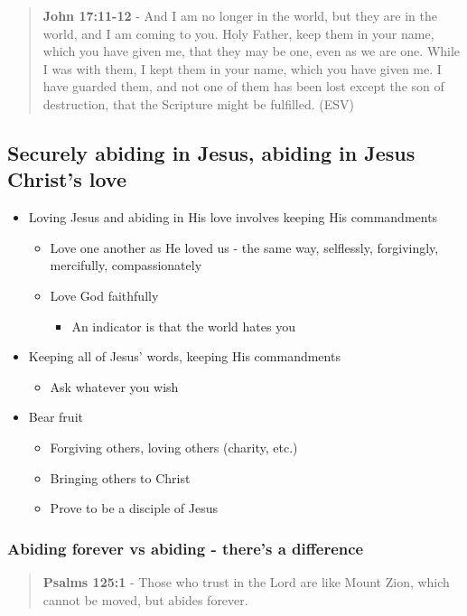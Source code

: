 \documentclass[11pt]{article}
\begin{document}
\begin{quote}
\textbf{John 17:11-12} -  And I am no longer in the world, but they are in the world, and I am coming to you.  Holy Father, keep them in your name, which you have given me, that they may be one, even as we are one.  While I was with them, I kept them in your name, which you have given me.  I have guarded them, and not one of them has been lost except the son of destruction, that the Scripture might be fulfilled. (ESV)
\end{quote}

\subsection{Securely abiding in Jesus, abiding in Jesus Christ's love}
\label{sec:orgd4b4bf4}
\begin{itemize}
\item Loving Jesus and abiding in His love involves keeping His commandments
\begin{itemize}
\item Love one another as He loved us - the same way, selflessly, forgivingly, mercifully, compassionately
\item Love God faithfully
\begin{itemize}
\item An indicator is that the world hates you
\end{itemize}
\end{itemize}
\item Keeping all of Jesus' words, keeping His commandments
\begin{itemize}
\item Ask whatever you wish
\end{itemize}
\item Bear fruit
\begin{itemize}
\item Forgiving others, loving others (charity, etc.)
\item Bringing others to Christ
\item Prove to be a disciple of Jesus
\end{itemize}
\end{itemize}

\subsubsection{Abiding forever vs abiding - there's a difference}
\label{sec:org9093fa2}
\begin{quote}
\textbf{Psalms 125:1} - Those who trust in the Lord are like Mount Zion, which cannot be moved, but abides forever.
\end{quote}
\end{document}
